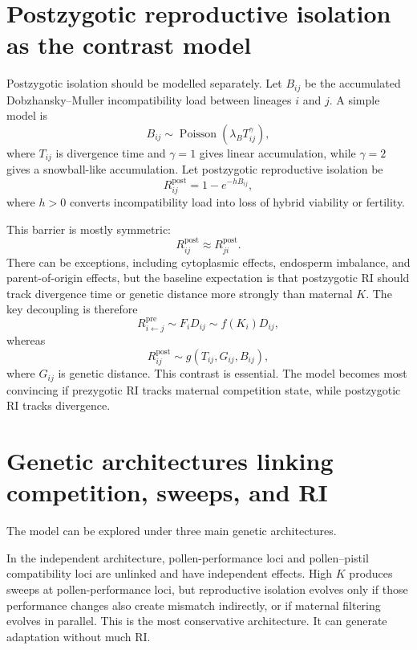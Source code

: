 \documentclass[11pt]{article}
\newcommand{\Rpre}{R^{\mathrm{pre}}}
\newcommand{\Rpost}{R^{\mathrm{post}}}
\begin{document}
\section{Postzygotic reproductive isolation as the contrast model}

Postzygotic isolation should be modelled separately. Let \(B_{ij}\) be the accumulated Dobzhansky--Muller incompatibility load between lineages \(i\) and \(j\). A simple model is
\begin{equation}
B_{ij}\sim \operatorname{Poisson}(\lambda_B T_{ij}^{\gamma}),
\label{eq:bdm_load}
\end{equation}
where \(T_{ij}\) is divergence time and \(\gamma=1\) gives linear accumulation, while \(\gamma=2\) gives a snowball-like accumulation. Let postzygotic reproductive isolation be
\begin{equation}
\Rpost_{ij}=1-e^{-hB_{ij}},
\label{eq:Rpost}
\end{equation}
where \(h>0\) converts incompatibility load into loss of hybrid viability or fertility.

This barrier is mostly symmetric:
\begin{equation}
\Rpost_{ij}\approx \Rpost_{ji}.
\end{equation}
There can be exceptions, including cytoplasmic effects, endosperm imbalance, and parent-of-origin effects, but the baseline expectation is that postzygotic RI should track divergence time or genetic distance more strongly than maternal \(K\). The key decoupling is therefore
\begin{equation}
\Rpre_{i\leftarrow j}\sim F_iD_{ij}\sim f(K_i)D_{ij},
\end{equation}
whereas
\begin{equation}
\Rpost_{ij}\sim g(T_{ij},G_{ij},B_{ij}),
\end{equation}
where \(G_{ij}\) is genetic distance. This contrast is essential. The model becomes most convincing if prezygotic RI tracks maternal competition state, while postzygotic RI tracks divergence.

\section{Genetic architectures linking competition, sweeps, and RI}

The model can be explored under three main genetic architectures.

In the independent architecture, pollen-performance loci and pollen--pistil compatibility loci are unlinked and have independent effects. High \(K\) produces sweeps at pollen-performance loci, but reproductive isolation evolves only if those performance changes also create mismatch indirectly, or if maternal filtering evolves in parallel. This is the most conservative architecture. It can generate adaptation without much RI.
\end{document}
